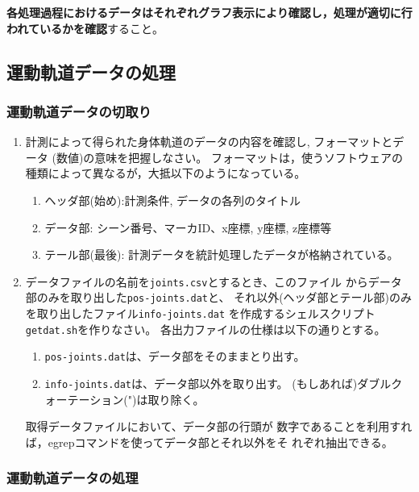 \documentclass{jsarticle}
\begin{document}
\textbf{各処理過程におけるデータはそれぞれグラフ表示により確認し，処理が適切に行われているかを確認}すること。

\subsection{運動軌道データの処理}
\subsubsection{運動軌道データの切取り}

\begin{enumerate}
\item 計測によって得られた身体軌道のデータの内容を確認し, フォーマットとデータ
  (数値)の意味を把握しなさい。
  フォーマットは，使うソフトウェアの種類によって異なるが，大抵以下のようになっている。
  \begin{enumerate}
  \item ヘッダ部(始め):計測条件, データの各列のタイトル
  \item データ部: シーン番号、マーカID、x座標, y座標, z座標等
  \item テール部(最後): 計測データを統計処理したデータが格納されている。
  \end{enumerate}
\item データファイルの名前を\verb|joints.csv|とするとき、このファイル
  からデータ部のみを取り出した\verb|pos-joints.dat|と、
  それ以外(ヘッダ部とテール部)のみを取り出したファイル\verb|info-joints.dat|
  を作成するシェルスクリプト\verb|getdat.sh|を作りなさい。
  各出力ファイルの仕様は以下の通りとする。
  \begin{enumerate}
  \item \verb|pos-joints.dat|は、データ部をそのままとり出す。
  \item \verb|info-joints.dat|は、データ部以外を取り出す。
    (もしあれば)ダブルクォーテーション(")は取り除く。
  \end{enumerate}
  取得データファイルにおいて、データ部の行頭が
  数字であることを利用すれば，egrepコマンドを使ってデータ部とそれ以外をそ
  れぞれ抽出できる。
\end{enumerate}


\subsubsection{運動軌道データの処理}
\end{document}
